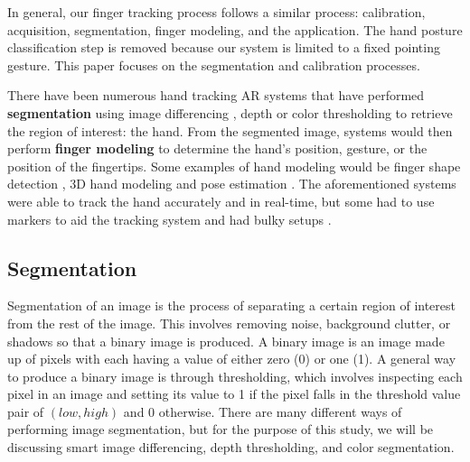 \documentclass{acm_proc_article-sp}
\begin{document}
In general, our finger tracking process follows a similar process: calibration, acquisition, segmentation, finger modeling, and the application. The hand posture classification step is removed because our system is limited to a fixed pointing gesture. This paper focuses on the segmentation and calibration processes.

There have been numerous hand tracking AR systems that have performed \textbf{segmentation} using image differencing \cite{Hardenberg:2001, Song:2008}, depth \cite{Kulshreshth:2013, Raheja:2011} or color thresholding \cite{Byron:2009, Gumpp:2006} to retrieve the region of interest: the hand. From the segmented image, systems would then perform \textbf{finger modeling} to determine the hand's position, gesture, or the position of the fingertips. Some examples of hand modeling would be finger shape detection \cite{Song:2008,Hardenberg:2001}, 3D hand modeling \cite{Byron:2009, Gumpp:2006} and pose estimation \cite{SchlattmannKahlesz:2007, Wang:2011}. The aforementioned systems were able to track the hand accurately and in real-time, but some had to use markers to aid the tracking system \cite{Chun:2013, Refinger:2007, Huynh:2009} and had bulky setups \cite{SchlattmannKahlesz:2007, Wang:2011}.


\subsection{Segmentation}

Segmentation of an image is the process of separating a certain region of interest from the rest of the image. This involves removing noise, background clutter, or shadows so that a binary image is produced. A binary image is an image made up of pixels with each having a value of either zero (0) or one (1). A general way to produce a binary image is through thresholding, which involves inspecting each pixel in an image and setting its value to 1 if the pixel falls in the threshold value pair of \( (low, high) \) and 0 otherwise. There are many different ways of performing image segmentation, but for the purpose of this study, we will be discussing smart image differencing, depth thresholding, and color segmentation.
\end{document}
